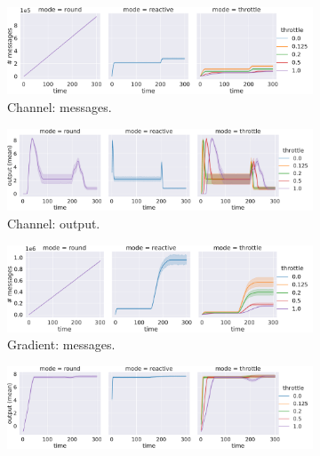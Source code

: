 \begin{figure}
  \centering
  \begin{subfigure}[b]{\linewidth}
      \centering
      \includegraphics[width=\textwidth]{papers/acsos2023-frp/imgs/channel-messages-rel}
      \caption{Channel: messages.}
      \label{acsos2023-frp:fig:channel-messages-rel}
  \end{subfigure}
  \begin{subfigure}[b]{\linewidth}
      \centering
      \includegraphics[width=\textwidth]{papers/acsos2023-frp/imgs/channel-output-rel}
      \caption{Channel: output.}
      \label{acsos2023-frp:fig:channel-output-rel}
  \end{subfigure}
  \begin{subfigure}[b]{\linewidth}
      \centering
      \includegraphics[width=\textwidth]{papers/acsos2023-frp/imgs/gradient-messages-rel}
      \caption{Gradient: messages.}
      \label{acsos2023-frp:fig:gradient-messages-rel}
  \end{subfigure}
  \begin{subfigure}[b]{\linewidth}
      \centering
      \includegraphics[width=\textwidth]{papers/acsos2023-frp/imgs/gradient-output-rel}

\end{subfigure}
\end{figure}
